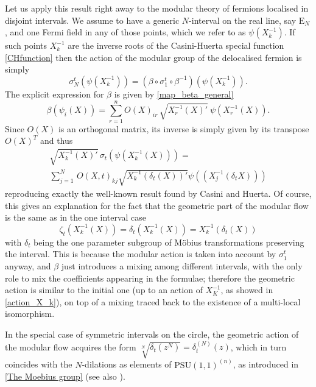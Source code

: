 Let us apply this result right away to the modular
theory of fermions localised in disjoint intervals.
We assume to have a generic $N$-interval on the real 
line, say $\textrm{E}_N$, and one Fermi field in any 
of those points, which we refer to as $\psi(X_k^{-1})$.
If such points $X_k^{-1}$ are the inverse roots of the
Casini-Huerta special function \eqref{CHfunction} then 
the action of the modular group of the delocalised fermion 
is simply 
\begin{equation}
\label{beta_intertwines}
\sigma_N^t(\psi(X_k^{-1}))=
(\beta\circ\sigma_1^t\circ\beta^{-1})(\psi(X_k^{-1})).
\end{equation}
The explicit expression for $\beta$ is given by 
\eqref{map_beta_general}
\begin{equation*}
\beta(\psi_i(X))= \sum_{r=1}^n {O(X)}_{ir}\,\sqrt{{X_r^{-1}(X)}'}\ 
\psi(X_r^{-1}(X)).
\end{equation*}
Since $O(X)$ is an orthogonal matrix, its inverse is 
simply given by its transpose $O(X)^T$ and thus 
\begin{multline*}
\sqrt{{X_k^{-1}(X)}'}\,\sigma_t\left(\psi(X_k^{-1}(X))\right)=\\
\sum_{j=1}^N\,O(X,t)_{kj}\sqrt{{X_k^{-1}(\delta_t(X))}'}
\psi\left((X_j^{-1}(\delta_t X))\right)
\end{multline*}
reproducing exactly the well-known result found by
Casini and Huerta. Of course, this gives an explanation
for the fact that the geometric part 
of the modular flow is the same as in the one interval 
case
\begin{equation}
\label{action_X_k}
\zeta_t(X_k^{-1}(X))=\delta_t(X_k^{-1}(X))=
X_k^{-1}(\delta_t(X))
\end{equation}
with $\delta_t$ being the one parameter subgroup of 
M\"{o}bius transformations preserving the interval.
This is because the modular action is taken into account 
by $\sigma_1^t$ anyway, and $\beta$ just introduces a mixing 
among different intervals, with the only role to mix  
the coefficients appearing in the formulae; therefore the 
geometric action is similar to the initial one (up 
to an action of $X_K^{-1}$, as showed in \eqref{action_X_k}),
on top of a mixing traced back to the existence 
of a multi-local isomorphism. 
\begin{example}
In the special case of symmetric intervals on the circle,
the geometric action of the modular flow acquires the 
form $\sqrt[N]{\delta_t(z^N)}=\delta_t^{(N)}(z)$, which in 
turn coincides with the $N$-dilations as elements 
of $\textrm{PSU}(1,1)^{(n)}$, as introduced in 
\ref{The Moebius group} (see also \cite{LMR:2009}).
\end{example}

